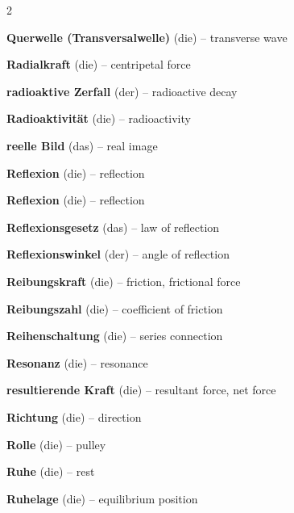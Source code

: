 \begin{multicols}{2}
\par\nopagebreak
\textbf{Querwelle (Transversalwelle)} (die) -- transverse wave\dotfill\hyperref[e:205]{\pageref*{e:205}}\par

\par\nopagebreak
\textbf{Radialkraft} (die) -- centripetal force\dotfill\hyperref[e:94]{\pageref*{e:94}}\par
\textbf{radioaktive Zerfall} (der) -- radioactive decay\dotfill\hyperref[e:274]{\pageref*{e:274}}\par
\textbf{Radioaktivität} (die) -- radioactivity\dotfill\hyperref[e:273]{\pageref*{e:273}}\par
\textbf{reelle Bild} (das) -- real image\dotfill\hyperref[e:250]{\pageref*{e:250}}\par
\textbf{Reflexion} (die) -- reflection\dotfill\hyperref[e:207]{\pageref*{e:207}}\par
\textbf{Reflexion} (die) -- reflection\dotfill\hyperref[e:227]{\pageref*{e:227}}\par
\textbf{Reflexionsgesetz} (das) -- law of reflection\dotfill\hyperref[e:228]{\pageref*{e:228}}\par
\textbf{Reflexionswinkel} (der) -- angle of reflection\dotfill\hyperref[e:231]{\pageref*{e:231}}\par
\textbf{Reibungskraft} (die) -- friction, frictional force\dotfill\hyperref[e:65]{\pageref*{e:65}}\par
\textbf{Reibungszahl} (die) -- coefficient of friction\dotfill\hyperref[e:66]{\pageref*{e:66}}\par
\textbf{Reihenschaltung} (die) -- series connection\dotfill\hyperref[e:162]{\pageref*{e:162}}\par
\textbf{Resonanz} (die) -- resonance\dotfill\hyperref[e:200]{\pageref*{e:200}}\par
\textbf{resultierende Kraft} (die) -- resultant force, net force\dotfill\hyperref[e:74]{\pageref*{e:74}}\par
\textbf{Richtung} (die) -- direction\dotfill\hyperref[e:62]{\pageref*{e:62}}\par
\textbf{Rolle} (die) -- pulley\dotfill\hyperref[e:86]{\pageref*{e:86}}\par
\textbf{Ruhe} (die) -- rest\dotfill\hyperref[e:31]{\pageref*{e:31}}\par
\textbf{Ruhelage} (die) -- equilibrium position\dotfill\hyperref[e:193]{\pageref*{e:193}}\par


\end{multicols}
